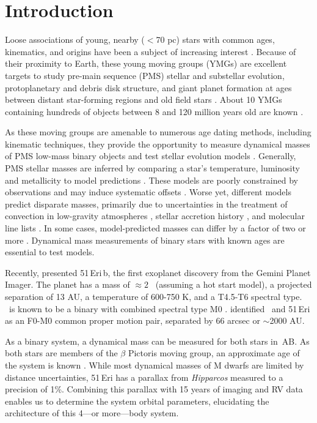
\section{Introduction}
\label{sec:intro}

Loose associations
of young, nearby ($<$70 pc) stars with common ages,
kinematics, and origins have been a subject of increasing interest
\citep{Zuckerman04, Shkolnik12, Malo13}.
Because of their proximity to Earth, these young
moving groups (YMGs) are excellent targets to study pre-main sequence (PMS)
stellar and substellar evolution, protoplanetary and debris disk structure,
and giant planet formation at ages between distant
star-forming regions and old field stars \citep[e.g.][]{Close05, Nielsen10}. 
About 10 YMGs containing hundreds of objects between 8 and 120 million years old 
are known \citep[e.g.][]{Torres08}.

As these moving groups are amenable to numerous age dating methods, including kinematic techniques, 
they provide the opportunity 
to measure dynamical masses of PMS low-mass binary 
objects and test stellar evolution models \citep{Stassun14}.
Generally, PMS stellar
masses are inferred by comparing a star's temperature,
luminosity and metallicity to model predictions
\citep[e.g.][]{Schaefer14}. 
These models
are poorly constrained by observations and may induce systematic
offsets \citep{Dupuy09, Dupuy14}. 
Worse yet, different models predict disparate masses, primarily
due to uncertainties in the treatment of convection in
low-gravity atmospheres \citep{Baraffe02}, stellar
accretion history \citep{Baraffe10}, and molecular line lists
\citep{Baraffe15}.
In some cases, model-predicted masses can differ by a factor of two or
more \citep{Hillenbrand04, Schlieder14}. 
Dynamical mass measurements of binary stars with known ages 
are essential to test models. 


Recently, \citet{Macintosh15} presented 51\,Eri\,b, the first
exoplanet discovery from the Gemini Planet Imager.
The planet has a mass of $\approx 2$ \mjup\ (assuming a hot start model), 
a projected separation of 13 AU,
a temperature of 600-750 K, and a T4.5-T6 spectral type.
\thisstarsix\ is known to be a binary with combined spectral type M0 
\citep{Kasper07}.
\citet{Feigelson06} identified \thisstarsix\ and 51\,Eri as an F0-M0 common proper motion pair, 
separated by $66$ arcsec or $\sim$2000 AU.

As a binary system,
a dynamical mass can be measured for both stars in \thisstarsix\,AB. 
As both stars are members of the $\beta$ Pictoris moving group, an approximate age of
the system is known \citep[$24 \pm 3$ Myr;][]{Binks14, Mamajek14, Bell15}.
While most dynamical masses of M dwarfs are limited by distance uncertainties, 
51\,Eri has a parallax from \textit{Hipparcos} measured
to a precision of 1\%.
Combining this parallax with 15 years of imaging and RV data enables us to determine
the system orbital parameters, elucidating
the architecture of this 4---or more---body system.

